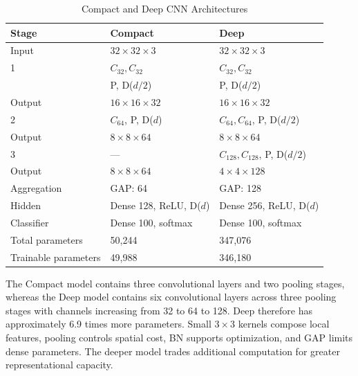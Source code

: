 \documentclass[conference]{IEEEtran}
\begin{document}
\begin{table}[!t]
\caption{Compact and Deep CNN Architectures}
\label{tab:architecture}
\centering
\footnotesize
\setlength{\tabcolsep}{3pt}
\begin{tabular}{@{}lll@{}}
\toprule
Stage & Compact & Deep \\
\midrule
Input
& $32\times32\times3$
& $32\times32\times3$ \\

1
& $C_{32},C_{32}$
& $C_{32},C_{32}$ \\

& P, D($d/2$)
& P, D($d/2$) \\

Output
& $16\times16\times32$
& $16\times16\times32$ \\

2
& $C_{64}$, P, D($d$)
& $C_{64},C_{64}$, P, D($d/2$) \\

Output
& $8\times8\times64$
& $8\times8\times64$ \\

3
& ---
& $C_{128},C_{128}$, P, D($d/2$) \\

Output
& $8\times8\times64$
& $4\times4\times128$ \\

Aggregation
& GAP: 64
& GAP: 128 \\

Hidden
& Dense 128, ReLU, D($d$)
& Dense 256, ReLU, D($d$) \\

Classifier
& Dense 100, softmax
& Dense 100, softmax \\

Total parameters
& 50,244
& 347,076 \\

Trainable parameters
& 49,988
& 346,180 \\
\bottomrule
\end{tabular}
\end{table}

The Compact model contains three convolutional layers and two pooling stages, whereas the Deep model contains six convolutional layers across three pooling stages with channels increasing from 32 to 64 to 128. Deep therefore has approximately 6.9 times more parameters. Small $3\times3$ kernels compose local features, pooling controls spatial cost, BN supports optimization, and GAP limits dense parameters. The deeper model trades additional computation for greater representational capacity.
\end{document}
